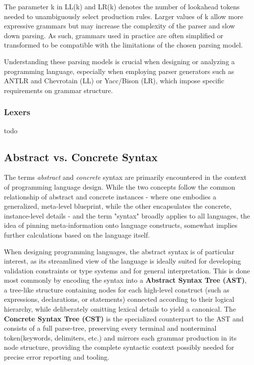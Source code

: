 The parameter k in LL(k) and LR(k) denotes the number of lookahead tokens needed to unambiguously select production rules.
Larger values of k allow more expressive grammars but may increase the complexity of the parser and slow down parsing.
As such, grammars used in practice are often simplified or transformed to be compatible with the limitations of the chosen parsing model.

Understanding these parsing models is crucial when designing or analyzing a programming language, especially when employing parser generators such as
ANTLR and Chevrotain (LL) or Yacc/Bison (LR), which impose specific requirements on grammar structure.

\subsubsection*{Lexers}
todo

\subsection{Abstract vs. Concrete Syntax}

The terms \textit{abstract} and \textit{concrete} syntax are primarily encountered in the context of programming language design. While the two concepts follow the common relationship of
abstract and concrete instances - where one embodies a generalized, meta-level blueprint, while the other encapsulates the concrete, instance-level details - and the term "syntax" broadly applies to all languages,
the idea of pinning meta-information onto language constructs, somewhat implies further calculations based on the language itself.

When designing programming languages, the abstract syntax is of particular interest, as its streamlined view of the language is ideally suited for developing
validation constraints or type systems and for general interpretation. This is done most commonly by encoding the syntax into a \textbf{Abstract Syntax Tree (AST)},
a tree-like structure containing nodes for each high-level construct (such as expressions, declarations, or statements) connected according to their logical hierarchy,
while deliberately omitting lexical details to yield a canonical. \cite{slonneger1995specifying}
The \textbf{Concrete Syntax Tree (CST)} is the specialized counterpart to the AST and consists of a full parse-tree, preserving every terminal and nonterminal
token(keywords, delimiters, etc.) and mirrors each grammar production in its node structure, providing the complete syntactic context possibly needed for precise error
reporting and tooling. \cite{aho2006compilers}

